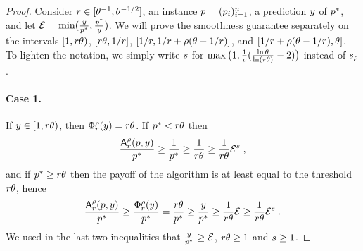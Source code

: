 \begin{proof}
Consider $r \in [\theta^{-1}, \theta^{-1/2}]$, an instance $p = (p_i)_{i=1}^n$, a prediction $y$ of $p^*$, and let $\mathcal{E} = \min(\frac{y}{p^*}, \frac{p^*}{y})$. We will prove the smoothness guarantee separately on the intervals $[1,r \theta)$, $[r \theta,1/r]$, $[1/r, 1/r + \rho(\theta - 1/r)]$, and $[1/r + \rho(\theta - 1/r), \theta]$. To lighten the notation, we simply write $s$ for $\max\big(1,\frac{1}{\rho}(\frac{\ln \theta}{\ln (r \theta)}-2)\big)$ instead of $s_\rho$.

\paragraph{Case 1.} If $y \in [1,r \theta)$, then $\Phi^\rho_r(y) = r \theta$. If $p^* < r \theta$ then
\[
\frac{\mbox{\textup{\textsf{A}}}^\rho_r(p,y)}{p^*}
\geq \frac{1}{p^*}
\geq \frac{1}{r \theta}
\geq \frac{1}{r \theta} \mathcal{E}^s\;,
\]
and if $p^* \geq r \theta$ then the payoff of the algorithm is at least equal to the threshold $r \theta$, hence
\[
\frac{\mbox{\textup{\textsf{A}}}^\rho_r(p,y)}{p^*}
\geq \frac{\Phi^\rho_r(y)}{p^*} = \frac{r \theta}{p^*}
\geq \frac{y}{p^*}
\geq \frac{1}{r \theta} \mathcal{E}
\geq \frac{1}{r \theta} \mathcal{E}^s
\;.
\]
We used in the last two inequalities that $\frac{y}{p^*} \geq \mathcal{E}$, $r \theta \geq 1$ and $s \geq 1$.



\end{proof}

